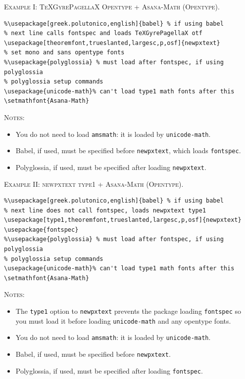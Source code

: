 \documentclass[11pt]{article}
\theoremstyle{oldplain}
\theoremstyle{plain}
\begin{document}
\textsc{Example I: TeXGyrePagellaX Opentype + Asana-Math (Opentype).}
\begin{verbatim}
%\usepackage[greek.polutonico,english]{babel} % if using babel
% next line calls fontspec and loads TeXGyrePagellaX otf
\usepackage[theoremfont,trueslanted,largesc,p,osf]{newpxtext}
% set mono and sans opentype fonts
%\usepackage{polyglossia} % must load after fontspec, if using polyglossia
% polyglossia setup commands
\usepackage{unicode-math}% can't load type1 math fonts after this
\setmathfont{Asana-Math}
\end{verbatim}
\textsc{Notes:}
\begin{itemize}
\item
You do not need to load {\tt amsmath}: it is loaded by {\tt unicode-math}.
\item Babel, if used, must be specified before {\tt newpxtext}, which loads {\tt fontspec}.
\item Polyglossia, if used, must be specified after loading {\tt newpxtext}.
\end{itemize}
\textsc{Example II: newpxtext type1 + Asana-Math (Opentype).}
\begin{verbatim}
%\usepackage[greek.polutonico,english]{babel} % if using babel
% next line does not call fontspec, loads newpxtext type1 
\usepackage[type1,theoremfont,trueslanted,largesc,p,osf]{newpxtext}
\usepackage{fontspec}
%\usepackage{polyglossia} % must load after fontspec, if using polyglossia
% polyglossia setup commands
\usepackage{unicode-math}% can't load type1 math fonts after this
\setmathfont{Asana-Math}
\end{verbatim}
\textsc{Notes:}
\begin{itemize}
\item The {\tt type1} option to {\tt newpxtext} prevents the package loading {\tt fontspec} so you must load it before loading {\tt unicode-math} and any opentype fonts.
\item
You do not need to load {\tt amsmath}: it is loaded by {\tt unicode-math}.
\item Babel, if used, must be specified before {\tt newpxtext}.
\item Polyglossia, if used, must be specified after loading {\tt fontspec}.
\end{itemize}
\end{document}
